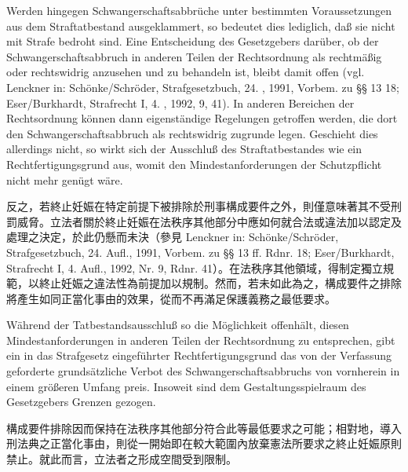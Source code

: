 \documentclass[12pt]{article}
\begin{document}
\begin{sourcepara}[title={原文D.91}]
Werden hingegen Schwangerschaftsabbrüche unter bestimmten Voraussetzungen aus dem Straftatbestand ausgeklammert, so bedeutet dies lediglich, daß sie nicht mit Strafe bedroht sind. Eine Entscheidung des Gesetzgebers darüber, ob der Schwangerschaftsabbruch in anderen Teilen der Rechtsordnung als rechtmäßig oder rechtswidrig anzusehen und zu behandeln ist, bleibt damit offen (vgl. Lenckner in: Schönke/Schröder, Strafgesetzbuch, 24. \abbrAufl{}, 1991, Vorbem. zu §§ 13 \abbrFF{} \abbrRdnr{} 18; Eser/Burkhardt, Strafrecht I, 4. \abbrAufl{}, 1992, \abbrNr{} 9, \abbrRdnr{} 41). In anderen Bereichen der Rechtsordnung können dann eigenständige Regelungen getroffen werden, die dort den Schwangerschaftsabbruch als rechtswidrig zugrunde legen. Geschieht dies allerdings nicht, so wirkt sich der Ausschluß des Straftatbestandes wie ein Rechtfertigungsgrund aus, womit den Mindestanforderungen der Schutzpflicht nicht mehr genügt wäre.
\end{sourcepara}
\begin{transpara}
反之，若終止妊娠在特定前提下被排除於刑事構成要件之外，則僅意味著其不受刑罰威脅。立法者關於終止妊娠在法秩序其他部分中應如何就合法或違法加以認定及處理之決定，於此仍懸而未決（參見 Lenckner in: Schönke/Schröder, Strafgesetzbuch, 24. Aufl., 1991, Vorbem. zu §§ 13 ff. Rdnr. 18; Eser/Burkhardt, Strafrecht I, 4. Aufl., 1992, Nr. 9, Rdnr. 41）。在法秩序其他領域，得制定獨立規範，以終止妊娠之違法性為前提加以規制。然而，若未如此為之，構成要件之排除將產生如同正當化事由的效果，從而不再滿足保護義務之最低要求。
\end{transpara}

\begin{sourcepara}[title={原文D.92}]
Während der Tatbestandsausschluß so die Möglichkeit offenhält, diesen Mindestanforderungen in anderen Teilen der Rechtsordnung zu entsprechen, gibt ein in das Strafgesetz eingeführter Rechtfertigungsgrund das von der Verfassung geforderte grundsätzliche Verbot des Schwangerschaftsabbruchs von vornherein in einem größeren Umfang preis. Insoweit sind dem Gestaltungsspielraum des Gesetzgebers Grenzen gezogen.
\end{sourcepara}
\begin{transpara}
構成要件排除因而保持在法秩序其他部分符合此等最低要求之可能；相對地，導入刑法典之正當化事由，則從一開始即在較大範圍內放棄憲法所要求之終止妊娠原則禁止。就此而言，立法者之形成空間受到限制。
\end{transpara}
\end{document}
